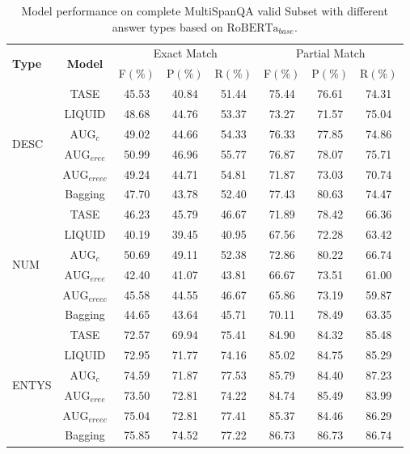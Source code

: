 \documentclass[a4paper,fleqn,twocolumn]{cas-dc}
\newcommand{\1}[1]{\mathds{1}\left[#1\right]}
\begin{document}
	\begin{table}[ht]
		\caption{Model performance on complete MultiSpanQA valid Subset with different answer types based on $\text{RoBERTa}_{base}$.}
		\label{tab:robertasub}
		\begin{tabular*}{\textwidth}{@{\extracolsep{\fill}}lccccccc}
			\toprule
			\multirow{2}{*}{\textbf{Type}} & \multirow{2}{*}{\textbf{Model}} & \multicolumn{3}{c}{Exact Match} & \multicolumn{3}{c}{Partial Match} \\
			\cmidrule{3-8} 
			& & F\((\%)\) & P\((\%)\) & R\((\%)\) & F\((\%)\) & P\((\%)\) & R\((\%)\) \\
			\midrule
			\multirow{6}{*}{DESC} & TASE & 45.53 & 40.84 & 51.44 & 75.44 & 76.61 & 74.31 \\ 
			& LIQUID & 48.68 & 44.76 & 53.37 & 73.27 & 71.57 & 75.04 \\
			& $\text{AUG}_{c}$ & 49.02 & 44.66 & 54.33 & 76.33 & 77.85 & 74.86 \\
			& $\text{AUG}_{eree}$ & 50.99 & 46.96 & 55.77 & 76.87 & 78.07 & 75.71 \\
			& $\text{AUG}_{ereec}$ & 49.24 & 44.71 & 54.81 & 71.87 & 73.03 & 70.74 \\
			& Bagging & 47.70 & 43.78 & 52.40 & 77.43 & 80.63 & 74.47 \\
			\midrule
			\multirow{6}{*}{NUM} & TASE & 46.23 & 45.79 & 46.67 & 71.89 & 78.42 & 66.36 \\ 
			& LIQUID & 40.19 & 39.45 & 40.95 & 67.56 & 72.28 & 63.42 \\
			& $\text{AUG}_{c}$ & 50.69 & 49.11 & 52.38 & 72.86 & 80.22 & 66.74 \\
			& $\text{AUG}_{eree}$ & 42.40 & 41.07 & 43.81 & 66.67 & 73.51 & 61.00 \\
			& $\text{AUG}_{ereec}$ & 45.58 & 44.55 & 46.67 & 65.86 & 73.19 & 59.87 \\
			& Bagging & 44.65 & 43.64 & 45.71 & 70.11 & 78.49 & 63.35 \\
			\midrule
			\multirow{6}{*}{ENTYS} & TASE & 72.57 & 69.94 & 75.41 & 84.90 & 84.32 & 85.48 \\ 
			& LIQUID & 72.95 & 71.77 & 74.16 & 85.02 & 84.75 & 85.29 \\
			& $\text{AUG}_{c}$ & 74.59 & 71.87 & 77.53 & 85.79 & 84.40 & 87.23 \\
			& $\text{AUG}_{eree}$ & 73.50 & 72.81 & 74.22 & 84.74 & 85.49 & 83.99 \\
			& $\text{AUG}_{ereec}$ & 75.04 & 72.81 & 77.41 & 85.37 & 84.46 & 86.29 \\
			& Bagging & 75.85 & 74.52 & 77.22 & 86.73 & 86.73 & 86.74 \\
			\bottomrule
		\end{tabular*}
	\end{table}
\end{document}
